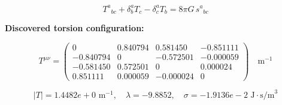 
\begin{equation}
  T^a{}_{bc} + \delta^a_b T_c - \delta^a_c T_b = 8\pi G \, s^a{}_{bc}
\end{equation}

\textbf{Discovered torsion configuration:}

\begin{equation}
  T^{\mu\nu} = \begin{pmatrix}
    0 & 0.840794 & 0.581450 & -0.851111 \\
    -0.840794 & 0 & -0.572501 & -0.000059 \\
    -0.581450 & 0.572501 & 0 & 0.000024 \\
    0.851111 & 0.000059 & -0.000024 & 0
  \end{pmatrix} \quad \text{m}^{-1}
\end{equation}

\begin{equation}
  |T| = 1.4482e+0 \text{ m}^{-1}, \quad
  \lambda = -9.8852, \quad
  \sigma = -1.9136e-2 \text{ J}\cdot\text{s/m}^3
\end{equation}